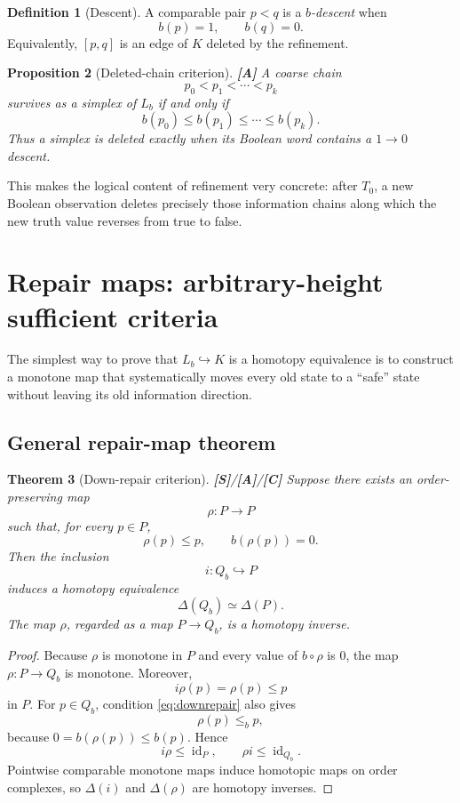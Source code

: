 \documentclass[11pt]{article}
\newtheorem{theorem}{Theorem}[section]
\newtheorem{proposition}[theorem]{Proposition}
\theoremstyle{definition}
\newtheorem{definition}[theorem]{Definition}
\newcommand{\statusS}{\textbf{[S]}}
\newcommand{\statusA}{\textbf{[A]}}
\newcommand{\statusC}{\textbf{[C]}}
\begin{document}
\begin{definition}[Descent]
A comparable pair $p<q$ is a \emph{$b$-descent} when
\[
b(p)=1,
\qquad
b(q)=0.
\]
Equivalently, $[p,q]$ is an edge of $K$ deleted by the refinement.
\end{definition}

\begin{proposition}[Deleted-chain criterion]\label{prop:deletedchain}
\statusA\;
A coarse chain
\[
p_0<p_1<\cdots<p_k
\]
survives as a simplex of $L_b$ if and only if
\[
b(p_0)\le b(p_1)\le\cdots\le b(p_k).
\]
Thus a simplex is deleted exactly when its Boolean word contains a $1\to0$ descent.
\end{proposition}

This makes the logical content of refinement very concrete: after $T_0$, a new Boolean observation deletes precisely those information chains along which the new truth value reverses from true to false.

\section{Repair maps: arbitrary-height sufficient criteria}

The simplest way to prove that $L_b\hookrightarrow K$ is a homotopy equivalence is to construct a monotone map that systematically moves every old state to a ``safe'' state without leaving its old information direction.

\subsection{General repair-map theorem}

\begin{theorem}[Down-repair criterion]\label{thm:downrepair}
\statusS/\statusA/\statusC\;
Suppose there exists an order-preserving map
\[
\rho:P\longrightarrow P
\]
such that, for every $p\in P$,
\begin{equation}\label{eq:downrepair}
\rho(p)\le p,
\qquad
b(\rho(p))=0.
\end{equation}
Then the inclusion
\[
i:Q_b\hookrightarrow P
\]
induces a homotopy equivalence
\[
\Delta(Q_b)\simeq\Delta(P).
\]
The map $\rho$, regarded as a map $P\to Q_b$, is a homotopy inverse.
\end{theorem}

\begin{proof}
Because $\rho$ is monotone in $P$ and every value of $b\circ\rho$ is $0$, the map $\rho:P\to Q_b$ is monotone. Moreover,
\[
i\rho(p)=\rho(p)\le p
\]
in $P$. For $p\in Q_b$, condition \eqref{eq:downrepair} also gives
\[
\rho(p)\le_b p,
\]
because $0=b(\rho(p))\le b(p)$. Hence
\[
i\rho\le\operatorname{id}_P,
\qquad
\rho i\le\operatorname{id}_{Q_b}.
\]
Pointwise comparable monotone maps induce homotopic maps on order complexes, so $\Delta(i)$ and $\Delta(\rho)$ are homotopy inverses.
\end{proof}
\end{document}
